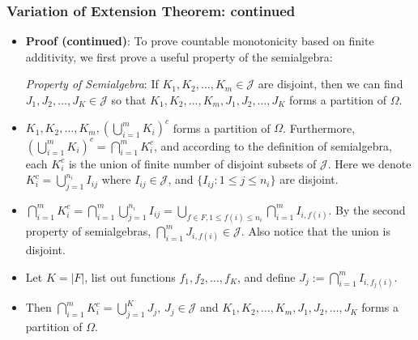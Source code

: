 \documentclass[handout]{beamer}
\begin{document}
\frame
{
  \frametitle{Variation of Extension Theorem: continued}

   \begin{itemize}

       
              \item<1-> []\textbf{Proof (continued)}:  To prove countable monotonicity based on finite additivity, we first prove a useful property of the semialgebra:
              
              \textit{Property of Semialgebra}: If $K_1, K_2,\ldots, K_m \in\mathcal{J} $ are disjoint, then we can find $J_1, J_2,\ldots, J_K \in \mathcal{J}$ so that $K_1, K_2,\ldots, K_m, J_1, J_2,\ldots, J_K $ forms a partition of $\Omega$. 
              
                             \item<2->[-]  $K_1, K_2,\ldots, K_m, (\bigcup_{i=1}^m K_i)^c$ forms a partition of $\Omega$. Furthermore, $ (\bigcup_{i=1}^m K_i)^c= \bigcap_{i=1}^m K_i^c$, and according to the definition of semialgebra, each $K_i^c$ is the union of finite number of disjoint subsets of $\mathcal{J}$. Here we denote $K_i^c=\bigcup_{j=1}^{n_i} I_{ij}$ where $I_{ij} \in \mathcal{J}$,  and $\{I_{ij}: 1\leq j\leq n_i\}$ are disjoint. 
             
            
                 \item<3->[-]  $\bigcap_{i=1}^m K_i^c=\bigcap_{i=1}^m \bigcup_{j=1}^{n_i} I_{ij}= \bigcup_{f \in F, 1\leq f(i) \leq n_i} \bigcap_{i=1}^m  I_{i, f(i)}$. By the second property of semialgebras, $\bigcap_{i=1}^m J_{i, f(i)} \in \mathcal{J}$. Also notice that the union is disjoint. 

				\item<4->[-] Let $K = |F|$, list out functions $f_1, f_2, \ldots, f_K$, and define $J_j := \bigcap_{i=1}^m  I_{i, f_j(i)}$.
                     
                 \item<5->[-] Then $\bigcap_{i=1}^m K_i^c=\bigcup_{j=1}^K J_j$, $J_j \in \mathcal{J}$ and $K_1, K_2,\ldots, K_m, J_1, J_2,\ldots, J_K $ forms a partition of $\Omega$. 
                 
                \end{itemize}
}
\end{document}
